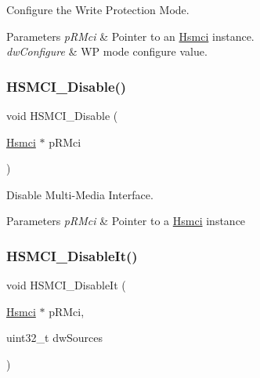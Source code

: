 Configure the Write Protection Mode. 


\begin{DoxyParams}{Parameters}
{\em p\+R\+Mci} & Pointer to an \mbox{\hyperlink{structHsmci}{Hsmci}} instance. \\
\hline
{\em dw\+Configure} & WP mode configure value. \\
\hline
\end{DoxyParams}
\mbox{\label{group__hsmci__functions_ga2c89bafa247d5b403603f9ecd26cbff7}} 
\subsubsection{\texorpdfstring{HSMCI\_Disable()}{HSMCI\_Disable()}}
{\footnotesize\ttfamily void H\+S\+M\+C\+I\+\_\+\+Disable (\begin{DoxyParamCaption}\item[{\mbox{\hyperlink{structHsmci}{Hsmci}} $\ast$}]{p\+R\+Mci }\end{DoxyParamCaption})}



Disable Multi-\/\+Media Interface. 


\begin{DoxyParams}{Parameters}
{\em p\+R\+Mci} & Pointer to a \mbox{\hyperlink{structHsmci}{Hsmci}} instance \\
\hline
\end{DoxyParams}
\mbox{\label{group__hsmci__functions_ga273099b0076489b4216672fb85d8a813}} 
\subsubsection{\texorpdfstring{HSMCI\_DisableIt()}{HSMCI\_DisableIt()}}
{\footnotesize\ttfamily void H\+S\+M\+C\+I\+\_\+\+Disable\+It (\begin{DoxyParamCaption}\item[{\mbox{\hyperlink{structHsmci}{Hsmci}} $\ast$}]{p\+R\+Mci,  }\item[{uint32\+\_\+t}]{dw\+Sources }\end{DoxyParamCaption})}



